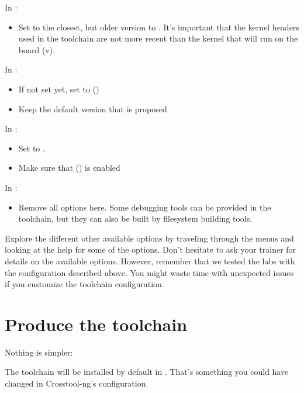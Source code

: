 In :
\begin{itemize}
\item Set  to the closest, but older version to
      \workingkernel. It's important that the kernel headers used in
      the toolchain are not more recent than the kernel that will run
      on the board (v\workingkernel).
\end{itemize}

In :
\begin{itemize}
  \item If not set yet, set  to 
        ()
  \item Keep the default version that is proposed
\end{itemize}

In :
\begin{itemize}
  \item Set  to .
  \item Make sure that  () is enabled
\end{itemize}

In :
\begin{itemize}
\item Remove all options here. Some debugging tools can be provided
      in the toolchain, but they can also be built by filesystem
      building tools.
\end{itemize}

Explore the different other available options by traveling through the
menus and looking at the help for some of the options. Don't hesitate
to ask your trainer for details on the available options. However,
remember that we tested the labs with the configuration described
above. You might waste time with unexpected issues if you customize the
toolchain configuration.

\section{Produce the toolchain}

Nothing is simpler:


The toolchain will be installed by default in .
That's something you could have changed in Crosstool-ng's configuration.

